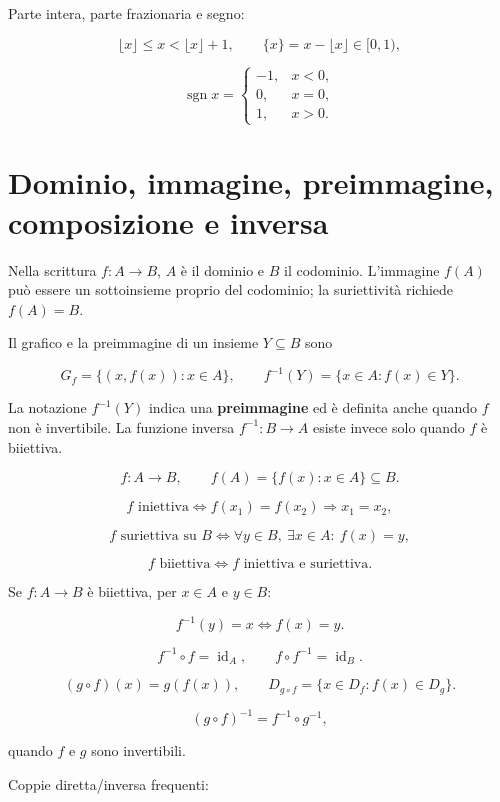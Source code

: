 Parte intera, parte frazionaria e segno:

\[
\lfloor x\rfloor\le x<\lfloor x\rfloor+1,
\qquad
\{x\}=x-\lfloor x\rfloor\in[0,1),
\]

\[
\operatorname{sgn}x=
\begin{cases}
-1,&x<0,\\
0,&x=0,\\
1,&x>0.
\end{cases}
\]

\section{Dominio, immagine, preimmagine, composizione e inversa}\label{dominio-immagine-preimmagine-composizione-e-inversa}

Nella scrittura \(f:A\to B\), \(A\) è il dominio e \(B\) il codominio. L'immagine \(f(A)\) può essere un sottoinsieme proprio del codominio; la suriettività richiede \(f(A)=B\).

Il grafico e la preimmagine di un insieme \(Y\subseteq B\) sono

\[
G_f=\{(x,f(x)):x\in A\},
\qquad
f^{-1}(Y)=\{x\in A:f(x)\in Y\}.
\]

La notazione \(f^{-1}(Y)\) indica una \textbf{preimmagine} ed è definita anche quando \(f\) non è invertibile. La funzione inversa \(f^{-1}:B\to A\) esiste invece solo quando \(f\) è biiettiva.

\[
f:A\to B,
\qquad
f(A)=\{f(x):x\in A\}\subseteq B.
\]

\[
f\text{ iniettiva}
\Longleftrightarrow
f(x_1)=f(x_2)\Rightarrow x_1=x_2,
\]

\[
f\text{ suriettiva su }B
\Longleftrightarrow
\forall y\in B,\ \exists x\in A:\ f(x)=y,
\]

\[
f\text{ biiettiva}
\Longleftrightarrow
f\text{ iniettiva e suriettiva}.
\]

Se \(f:A\to B\) è biiettiva, per \(x\in A\) e \(y\in B\):

\[
f^{-1}(y)=x
\Longleftrightarrow
f(x)=y.
\]

\[
f^{-1}\circ f=\operatorname{id}_A,
\qquad
f\circ f^{-1}=\operatorname{id}_B.
\]

\[
(g\circ f)(x)=g(f(x)),
\qquad
D_{g\circ f}=\{x\in D_f:f(x)\in D_g\}.
\]

\[
(g\circ f)^{-1}=f^{-1}\circ g^{-1},
\]

quando \(f\) e \(g\) sono invertibili.

Coppie diretta/inversa frequenti:

